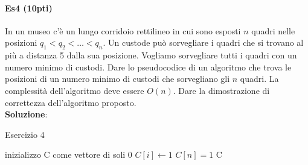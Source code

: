 \paragraph{Es4 (10pti)}
In un museo c'è un lungo corridoio rettilineo in cui sono esposti $n$ quadri nelle posizioni $q_{1} < q_{2} < \ldots < q_{n}$. Un custode può sorvegliare i quadri che si trovano al più a distanza 5 dalla sua posizione. Vogliamo sorvegliare tutti i quadri con un numero minimo di custodi. Dare lo pseudocodice di un algoritmo che trova le posizioni di un numero minimo di custodi che sorvegliano gli $n$ quadri. La complessità dell'algoritmo deve essere $O(n)$. Dare la dimostrazione di correttezza dell'algoritmo proposto. \\
\textbf{Soluzione}:
\begin{algorithm}
	\caption{Esercizio 4}\label{alg:es4}
	\begin{algorithmic}[1]
			\State inizializzo C come vettore di soli 0
					\State $C[i] \gets 1$
				\EndIf
			\EndFor
				\State $C[n] = 1$
			\EndIf
			\State \Return C
		\EndFunction
	\end{algorithmic}
\end{algorithm} \\ \hfill


